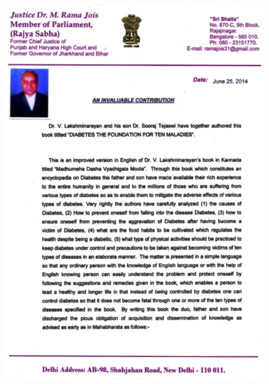 \thispagestyle{empty}


\begin{figure}[h]
\centering
\includegraphics[scale=2.1]{images/002.jpg}
\end{figure}

